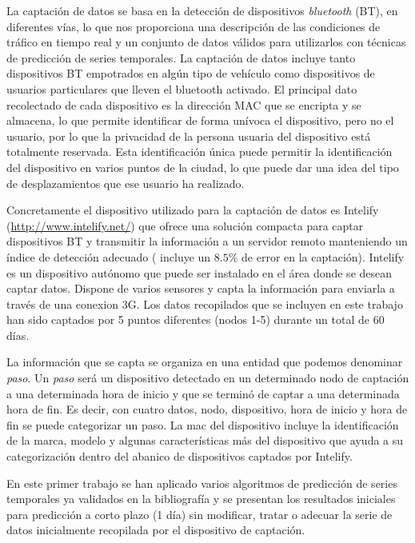 \documentclass[runningheads]{llncs}
\begin{document}
La captación de datos se basa en la detección de dispositivos \textit{bluetooth} (BT),
en diferentes vías, lo que nos proporciona una descripción de las condiciones de tráfico en tiempo
real y un conjunto de datos válidos para utilizarlos con técnicas de predicción de series
temporales. La captación de datos incluye tanto dispositivos BT empotrados en algún tipo de
vehículo como dispositivos de usuarios particulares que lleven el bluetooth activado. El principal
dato recolectado de cada dispositivo es la dirección MAC que se encripta y se almacena, lo que
permite identificar de forma unívoca el dispositivo, pero no el usuario, por lo que la privacidad de
la persona usuaria del dispositivo está totalmente reservada. Esta identificación única puede
permitir la identificación del dispositivo en varios puntos de la ciudad, lo que puede dar una idea
del tipo de desplazamientos que ese usuario ha realizado. 

Concretamente el dispositivo utilizado para la captación de datos es Intelify (\url{http://www.intelify.net/}) que ofrece una solución compacta para captar
dispositivos BT y transmitir la información a un servidor remoto manteniendo un índice de detección
adecuado ( incluye un $8.5\%$ de error en la captación). Intelify es un dispositivo autónomo que puede ser instalado en el área donde se desean captar
datos. Dispone de varios sensores y capta la información para enviarla a través de una conexion 3G. 
Los datos recopilados que se incluyen en este trabajo han sido captados por 5 puntos diferentes
(nodos 1-5) durante un total de 60 días. 

La información que se capta se organiza en una entidad que podemos denominar \textit{paso}. Un \textit{paso} será un dispositivo
detectado en un determinado nodo de captación a una determinada hora de inicio y que se terminó de captar a una
determinada hora de fin. Es decir, con cuatro datos, nodo, dispositivo, hora de inicio y hora de fin se puede categorizar
un paso. La mac del dispositivo incluye la identificación de la marca, modelo y algunas características más del dispositivo que
ayuda a su categorización dentro del abanico de dispositivos captados por Intelify. 

En este primer trabajo se han aplicado varios algoritmos de predicción de series temporales ya
validados en la bibliografía y se presentan los resultados iniciales para predicción a corto plazo
(1 día) sin modificar, tratar o adecuar la serie de datos inicialmente recopilada por el dispositivo
de captación. 
\end{document}
